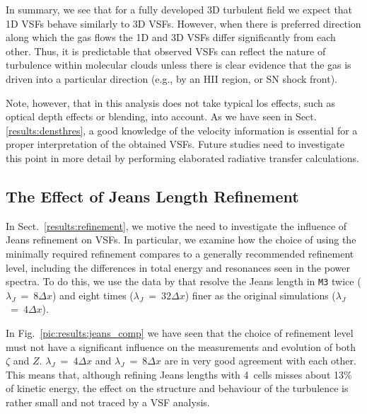 In summary, we see that for a fully developed 3D turbulent field we expect that 1D VSFs behave similarly to 3D VSFs.
However, when there is preferred direction along which the gas flows the 1D and 3D VSFs differ significantly from each other. 
Thus, it is predictable that observed VSFs can reflect the nature of turbulence within molecular clouds unless there is clear evidence that the gas is driven into a particular direction (e.g., by an HII region, or SN shock front).

Note, however, that in this analysis does not take typical los effects, such as optical depth effects or blending, into account. 
As we have seen in Sect.\ref{results:densthres}, a good knowledge of the velocity information is essential for a proper interpretation of the obtained VSFs.
Future studies need to investigate this point in more detail by performing elaborated radiative transfer calculations. 



\subsection{The Effect of Jeans Length Refinement}\label{discussion:refinement}

In Sect.~\ref{results:refinement}, we motive the need to investigate the influence of Jeans refinement on VSFs.
In particular, we examine how the choice of using the minimally required refinement compares to a generally recommended refinement level, including the differences in total energy and resonances seen in the power spectra. 
To do this, we use the data by  that resolve the Jeans length in \texttt{M3} twice ($\lambda_J$~=~$8\Delta{}x$) and eight times ($\lambda_J$~=~$32\Delta{}x$) finer as the original simulations ($\lambda_J$~=~$4\Delta{}x$).

In Fig.~\ref{pic:results:jeans_comp} we have seen that the choice of refinement level must not have a significant influence on the measurements and evolution of both $\zeta$ and $Z$. 
$\lambda_J$~=~$4\Delta{}x$ and $\lambda_J$~=~$8\Delta{}x$ are in very good agreement with each other.
This means that, although refining Jeans lengths with 4~cells misses about 13\% of kinetic energy, the effect on the structure and behaviour of the turbulence is rather small and not traced by a VSF analysis.

